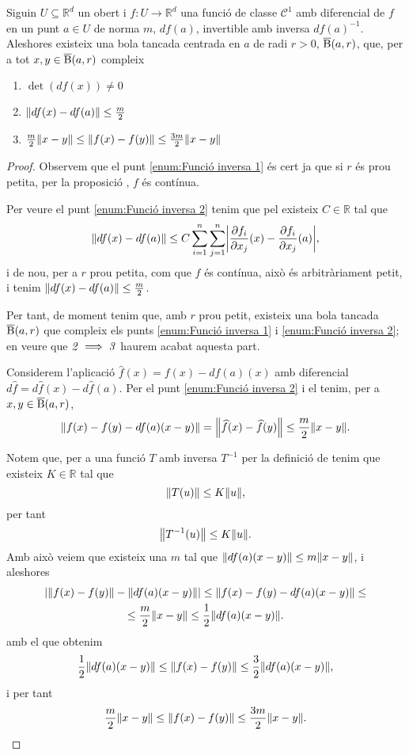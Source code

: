 \documentclass[../Apunts.tex]{subfiles}
\begin{document}
	\begin{lemma}\label{lemma:Funció inversa}
		Siguin \(U\subseteq\mathbb{R}^{d}\) un obert i \(f\colon U\to\mathbb{R}^{d}\) una funció de classe \(\mathcal{C}^{1}\) amb diferencial de \(f\) en un punt \(a\in U\) de norma \(m\), \(df(a)\), invertible amb inversa \(df(a)^{-1}\). Aleshores existeix una bola tancada centrada en \(a\) de radi \(r>0\), \(\overline{\operatorname{B}}(a,r)\), que, per a tot \(x,y\in\overline{\operatorname{B}}(a,r)\) compleix
		\begin{enumerate}
			\item\label{enum:Funció inversa 1} \(\det(df(x))\neq0\)
			\item\label{enum:Funció inversa 2} \(\norm{df(x)-df(a)}\leq\frac{m}{2}\)
			\item\label{enum:Funció inversa 3} \(\frac{m}{2}\norm{x-y}\leq\norm{f(x)-f(y)}\leq\frac{3m}{2}\norm{x-y}\)
		\end{enumerate}
		\begin{proof}
			Observem que el punt \eqref{enum:Funció inversa 1} és cert ja que si \(r\) és prou petita, per la proposició , \(f\) és contínua.
			
			Per veure el punt \eqref{enum:Funció inversa 2} tenim que pel  existeix \(C\in\mathbb{R}\) tal que
			\[\norm{df(x)-df(a)}\leq C\sum_{i=1}^{n}\sum_{j=1}^{n}\abs{\frac{\partial f_{i}}{\partial x_{j}}(x)-\frac{\partial f_{i}}{\partial x_{j}}(a)},\]
			i de nou, per a \(r\) prou petita, com que \(f\) és contínua, això és arbitràriament petit, i tenim \(\norm{df(x)-df(a)}\leq\frac{m}{2}\).
			
			Per tant, de moment tenim que, amb \(r\) prou petit, existeix una bola tancada \(\overline{\operatorname{B}}(a,r)\) que compleix els punts \eqref{enum:Funció inversa 1} i \eqref{enum:Funció inversa 2}; en veure que \(\mathit{2}\implies\mathit{3}\) haurem acabat aquesta part.
			
			Considerem l'aplicació \(\widehat{f}(x)=f(x)-df(a)(x)\) amb diferencial \(d\widehat{f}=d\widehat{f}(x)-d\widehat{f}(a)\). Per el punt \eqref{enum:Funció inversa 2} i el  tenim, per a \(x,y\in\overline{\operatorname{B}}(a,r)\), %
			\[\norm{f(x)-f(y)-df(a)(x-y)}=\norm{\widehat{f}(x)-\widehat{f}(y)}\leq\frac{m}{2}\norm{x-y}.\]
			
			Notem que, per a una funció \(T\) amb inversa \(T^{-1}\) per la definició de  tenim que existeix \(K\in\mathbb{R}\) tal que
			\[\norm{T(u)}\leq K\norm{u},\]
			per tant
			\[\norm{T^{-1}(u)}\leq K\norm{u}.\]
			Amb això veiem que existeix una \(m\) tal que \(\norm{df(a)(x-y)}\leq m\norm{x-y}\), i aleshores
			\begin{multline*}
			\abs{\norm{f(x)-f(y)}-\norm{df(a)(x-y)}}\leq\norm{f(x)-f(y)-df(a)(x-y)}\leq\\\leq\frac{m}{2}\norm{x-y}\leq\frac{1}{2}\norm{df(a)(x-y)}.
			\end{multline*}
			amb el que obtenim
			\[\frac{1}{2}\norm{df(a)(x-y)}\leq\norm{f(x)-f(y)}\leq\frac{3}{2}\norm{df(a)(x-y)},\]
			i per tant
			\[\frac{m}{2}\norm{x-y}\leq\norm{f(x)-f(y)}\leq\frac{3m}{2}\norm{x-y}.\qedhere\]
		\end{proof}
	\end{lemma}
\end{document}

